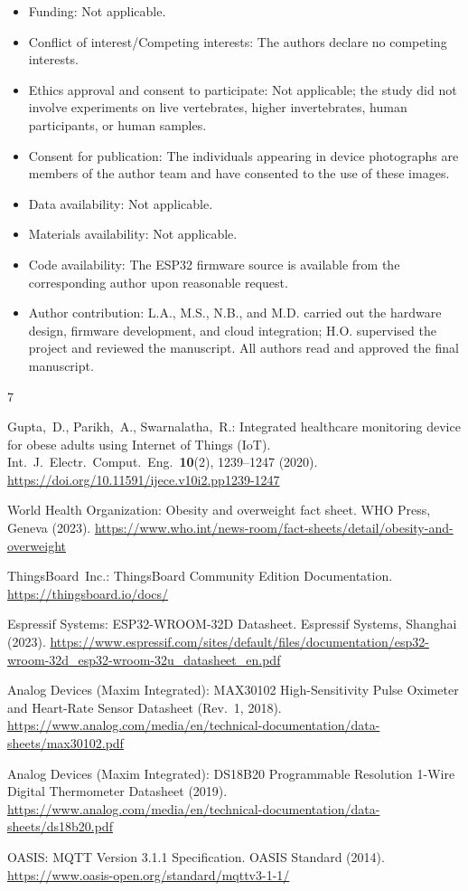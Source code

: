 \documentclass[pdflatex,sn-mathphys-num]{sn-jnl}
\begin{document}
\begin{itemize}
\footnotesize
\item Funding: Not applicable.
\item Conflict of interest/Competing interests: The authors declare
  no competing interests.
\item Ethics approval and consent to participate: Not applicable;
  the study did not involve experiments on live vertebrates, higher
  invertebrates, human participants, or human samples.
\item Consent for publication: The individuals appearing in device
  photographs are members of the author team and have consented to
  the use of these images.
\item Data availability: Not applicable.
\item Materials availability: Not applicable.
\item Code availability: The ESP32 firmware source is available from
  the corresponding author upon reasonable request.
\item Author contribution: L.A., M.S., N.B., and M.D. carried out the
  hardware design, firmware development, and cloud integration; H.O.
  supervised the project and reviewed the manuscript. All authors
  read and approved the final manuscript.
\end{itemize}

\vspace{-8pt}
\begin{thebibliography}{7}
\footnotesize

Gupta,~D., Parikh,~A., Swarnalatha,~R.:
Integrated healthcare monitoring device for obese adults using
Internet of Things (IoT).
Int.\ J.\ Electr.\ Comput.\ Eng.\ \textbf{10}(2), 1239--1247 (2020).
\url{https://doi.org/10.11591/ijece.v10i2.pp1239-1247}

World Health Organization: Obesity and overweight fact sheet.
WHO Press, Geneva (2023).
\url{https://www.who.int/news-room/fact-sheets/detail/obesity-and-overweight}

ThingsBoard~Inc.: ThingsBoard Community Edition Documentation.
\url{https://thingsboard.io/docs/}

Espressif Systems: ESP32-WROOM-32D Datasheet.
Espressif Systems, Shanghai (2023).
\url{https://www.espressif.com/sites/default/files/documentation/esp32-wroom-32d_esp32-wroom-32u_datasheet_en.pdf}

Analog Devices (Maxim Integrated): MAX30102 High-Sensitivity Pulse
Oximeter and Heart-Rate Sensor Datasheet (Rev.\ 1, 2018).
\url{https://www.analog.com/media/en/technical-documentation/data-sheets/max30102.pdf}

Analog Devices (Maxim Integrated): DS18B20 Programmable Resolution
1-Wire Digital Thermometer Datasheet (2019).
\url{https://www.analog.com/media/en/technical-documentation/data-sheets/ds18b20.pdf}

OASIS: MQTT Version 3.1.1 Specification. OASIS Standard (2014).
\url{https://www.oasis-open.org/standard/mqttv3-1-1/}

\end{thebibliography}
\end{document}
